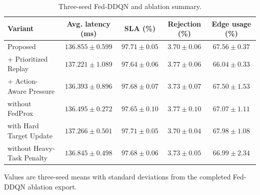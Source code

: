 \begin{table}[!t]
\centering
\caption{Three-seed Fed-DDQN and ablation summary.}
\label{tab:multiseed_ablation}
\small
\setlength{\tabcolsep}{5pt}
\renewcommand{\arraystretch}{1.08}
\begin{tabular*}{0.96\textwidth}{@{\extracolsep{\fill}}lcccc@{}}
\toprule
Variant & Avg. latency (ms) & SLA (\%) & Rejection (\%) & Edge usage (\%) \\
\midrule
\fedddqn{} Proposed & $136.855 \pm 0.599$ & $97.71 \pm 0.05$ & $3.70 \pm 0.06$ & $67.56 \pm 0.37$ \\
\fedddqn{} + Prioritized Replay & $137.221 \pm 1.089$ & $97.64 \pm 0.06$ & $3.77 \pm 0.06$ & $66.04 \pm 0.33$ \\
\fedddqn{} + Action-Aware Pressure & $136.393 \pm 0.896$ & $97.68 \pm 0.07$ & $3.73 \pm 0.07$ & $67.50 \pm 1.53$ \\
\fedddqn{} without FedProx & $136.495 \pm 0.272$ & $97.65 \pm 0.10$ & $3.77 \pm 0.10$ & $67.07 \pm 1.11$ \\
\fedddqn{} with Hard Target Update & $137.266 \pm 0.501$ & $97.71 \pm 0.05$ & $3.70 \pm 0.04$ & $67.98 \pm 1.08$ \\
\fedddqn{} without Heavy-Task Penalty & $136.845 \pm 0.498$ & $97.68 \pm 0.06$ & $3.73 \pm 0.05$ & $66.99 \pm 2.34$ \\
\bottomrule
\end{tabular*}
\par\smallskip
\begin{minipage}{0.94\textwidth}
\footnotesize Values are three-seed means with standard deviations from the completed Fed-DDQN ablation export.
\end{minipage}
\end{table}
